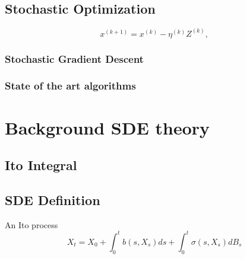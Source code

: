 \documentclass[12pt]{article}
\theoremstyle{definition}
\numberwithin{equation}{section}
\begin{document}
\subsection{Stochastic Optimization}
\label{sec:StochasticOptimization}
\begin{equation}
  x^{(k+1)} = x^{(k)} - \eta^{(k)} Z^{(k)},
\end{equation}
\subsubsection{Stochastic Gradient Descent}

\subsubsection{State of the art algorithms}
\label{sec:StateOfTheArtAlgorithms}

\section{Background SDE theory}
\label{sec:BackgroundSDETheory}
\subsection{Ito Integral}
\label{subsec:ItoIntegral}
\subsection{SDE Definition}
\label{subsec:SDEDefinition}

An Ito process 
\begin{equation}
  X_t = X_0 + \int_0^tb(s, X_s)ds + \int_0^t \sigma(s, X_s)dB_s
\end{equation}
\end{document}
